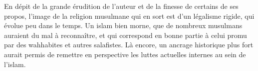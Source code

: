 En dépit de la grande érudition de l’auteur et de la finesse de certains de ses propos, l’image de la religion musulmane qui en sort est d’un légalisme rigide, qui évolue peu dans le temps. Un islam bien morne, que de nombreux musulmans auraient du mal à reconnaître, et qui correspond en bonne partie à celui promu par des wahhabites et autres salafistes. Là encore, un ancrage historique plus fort aurait permis de
remettre en perspective les luttes actuelles internes au sein de l’islam.
 


